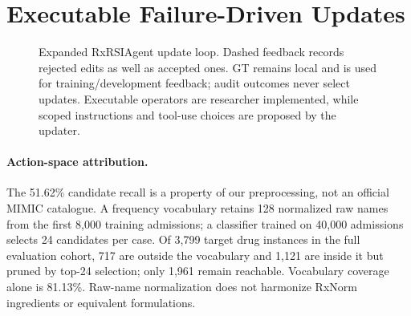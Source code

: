 \section{Executable Failure-Driven Updates}\label{app:bounded}
\begin{figure}[t]
\centering
{}
\caption{Expanded RxRSIAgent update loop. Dashed feedback records rejected edits as well as accepted ones. GT remains local and is used for training/development feedback; audit outcomes never select updates. Executable operators are researcher implemented, while scoped instructions and tool-use choices are proposed by the updater.}
\label{fig:boundedupdates}
\end{figure}
\paragraph{Action-space attribution.} The 51.62\% candidate recall is a property of our preprocessing, not an official MIMIC catalogue. A frequency vocabulary retains 128 normalized raw names from the first 8,000 training admissions; a classifier trained on 40,000 admissions selects 24 candidates per case. Of 3,799 target drug instances in the full evaluation cohort, 717 are outside the vocabulary and 1,121 are inside it but pruned by top-24 selection; only 1,961 remain reachable. Vocabulary coverage alone is 81.13\%. Raw-name normalization does not harmonize RxNorm ingredients or equivalent formulations.
